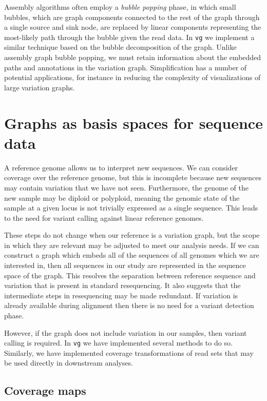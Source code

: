 Assembly algorithms often employ a \emph{bubble popping} phase, in which small bubbles, which are graph components connected to the rest of the graph through a single source and sink node, are replaced by linear components representing the most-likely path through the bubble given the read data.
In {\tt vg} we implement a similar technique based on the bubble decomposition of the graph.
Unlike assembly graph bubble popping, we must retain information about the embedded paths and annotations in the variation graph.
Simplification has a number of potential applications, for instance in reducing the complexity of visualizations of large variation graphs.

\section{Graphs as basis spaces for sequence data}
\label{sec:basis_space}

A reference genome allows us to interpret new sequences.
We can consider coverage over the reference genome, but this is incomplete because new sequences may contain variation that we have not seen.
Furthermore, the genome of the new sample may be diploid or polyploid, meaning the genomic state of the sample at a given locus is not trivially expressed as a single sequence.
This leads to the need for variant calling against linear reference genomes.

These steps do not change when our reference is a variation graph, but the scope in which they are relevant may be adjusted to meet our analysis needs.
If we can construct a graph which embeds all of the sequences of all genomes which we are interested in, then all sequences in our study are represented in the sequence space of the graph.
This resolves the separation between reference sequence and variation that is present in standard resequencing.
It also suggests that the intermediate steps in resequencing may be made redundant.
If variation is already available during alignment then there is no need for a variant detection phase.

However, if the graph does not include variation in our samples, then variant calling is required.
In {\tt vg} we have implemented several methods to do so.
Similarly, we have implemented coverage transformations of read sets that may be used directly in downstream analyses.

\subsection{Coverage maps}

